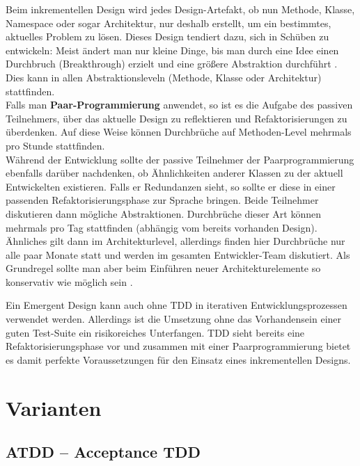 Beim inkrementellen Design wird jedes Design-Artefakt, ob nun Methode, Klasse, Namespace oder sogar Architektur, nur deshalb erstellt, um ein bestimmtes, aktuelles Problem zu lösen. Dieses Design tendiert dazu, sich in Schüben zu entwickeln: Meist ändert man nur kleine Dinge, bis man durch eine Idee einen Durchbruch (Breakthrough) erzielt und eine größere Abstraktion durchführt \cite{shore_art_2007,evans_domain_driven_2003}. Dies kann in allen Abstraktionsleveln (Methode, Klasse oder Architektur) stattfinden.\\
Falls man \textbf{Paar-Programmierung} anwendet, so ist es die Aufgabe des passiven Teilnehmers, über das aktuelle Design zu reflektieren und Refaktorisierungen zu überdenken. Auf diese Weise können Durchbrüche auf Methoden-Level mehrmals pro Stunde stattfinden.\\
Während der Entwicklung sollte der passive Teilnehmer der Paarprogrammierung ebenfalls darüber nachdenken, ob Ähnlichkeiten anderer Klassen zu der aktuell Entwickelten existieren. Falls er Redundanzen sieht, so sollte er diese in einer passenden Refaktorisierungsphase zur Sprache bringen. Beide Teilnehmer diskutieren dann mögliche Abstraktionen. Durchbrüche dieser Art können mehrmals pro Tag stattfinden (abhängig vom bereits vorhanden Design).\\
Ähnliches gilt dann im Architekturlevel, allerdings finden hier Durchbrüche nur alle paar Monate statt und werden im gesamten Entwickler-Team diskutiert. Als Grundregel sollte man aber beim Einführen neuer Architekturelemente so konservativ wie möglich sein \citep{shore_art_2007}.

Ein Emergent Design kann auch ohne TDD in iterativen Entwicklungsprozessen verwendet werden. Allerdings ist die Umsetzung ohne das Vorhandensein einer guten Test-Suite ein risikoreiches Unterfangen. TDD sieht bereits eine Refaktorisierungsphase vor und zusammen mit einer Paarprogrammierung bietet es damit perfekte Voraussetzungen für den Einsatz eines inkrementellen Designs.

\section{Varianten}
\subsection{ATDD -- Acceptance TDD}
\label{sec:attd}

